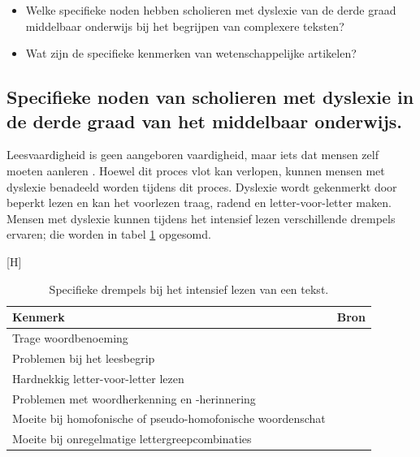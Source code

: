 \begin{itemize}
	\item Welke specifieke noden hebben scholieren met dyslexie van de derde graad middelbaar onderwijs bij het begrijpen van complexere teksten?
	\item Wat zijn de specifieke kenmerken van wetenschappelijke artikelen?
\end{itemize}

\subsection{Specifieke noden van scholieren met dyslexie in de derde graad van het middelbaar onderwijs.}

Leesvaardigheid is geen aangeboren vaardigheid, maar iets dat mensen zelf moeten aanleren \autocite{Bonte2020, VanDerMeer2022}. Hoewel dit proces vlot kan verlopen, kunnen mensen met dyslexie benadeeld worden tijdens dit proces.  Dyslexie wordt gekenmerkt door beperkt lezen en kan het voorlezen traag, radend en letter-voor-letter maken. Mensen met dyslexie kunnen tijdens het intensief lezen verschillende drempels ervaren; die worden in tabel \ref{table:dyslexia-hurdles} opgesomd.

\begin{center}[H]
	\begin{table}
	\begin{tabular}{ | m{10cm} | m{6cm} | } 
		\hline
		\textbf{Kenmerk} & \textbf{Bron} \\ 
		\hline
		Trage woordbenoeming &  \autocite{Bonte2020} \\
		\hline
		Problemen bij het leesbegrip & \autocite{Gala2016, Bonte2020} \\ 
		\hline
		Hardnekkig letter-voor-letter lezen & \autocite{Bonte2020, Zhang2021} \\ 
		\hline
		Problemen met woordherkenning en -herinnering & \autocite{Bonte2020} \\
		\hline
		Moeite bij homofonische of pseudo-homofonische woordenschat & \autocite{Zhang2021} \\
		\hline
		Moeite bij onregelmatige lettergreepcombinaties & \textcite{Gala2016} \\
		\hline
	\end{tabular}
	\caption{Specifieke drempels bij het intensief lezen van een tekst.}
	\label{table:dyslexia-hurdles}
	\end{table}
\end{center}

